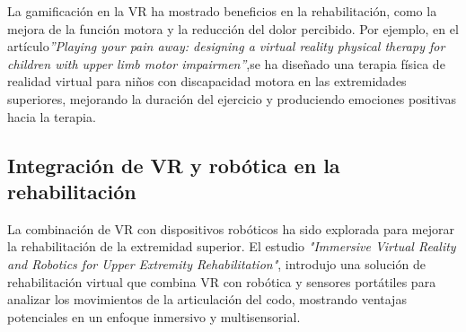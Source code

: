 La gamificación en la VR ha mostrado beneficios en la rehabilitación, como la mejora de la función motora y la reducción del dolor percibido. Por ejemplo, en el artículo\textit{''Playing your pain away: designing a virtual reality physical therapy for children with upper limb motor impairmen''}\cite{vr_kids_pain2023},se ha diseñado una terapia física de realidad virtual para niños con discapacidad motora en las extremidades superiores, mejorando la duración del ejercicio y produciendo emociones positivas hacia la terapia.

\subsection{Integración de VR y robótica en la rehabilitación}

La combinación de VR con dispositivos robóticos ha sido explorada para mejorar la rehabilitación de la extremidad superior. El estudio \textit{"Immersive Virtual Reality and Robotics for Upper Extremity Rehabilitation"}\cite{vr_robotics2023}, introdujo una solución de rehabilitación virtual que combina VR con robótica y sensores portátiles para analizar los movimientos de la articulación del codo, mostrando ventajas potenciales en un enfoque inmersivo y multisensorial.